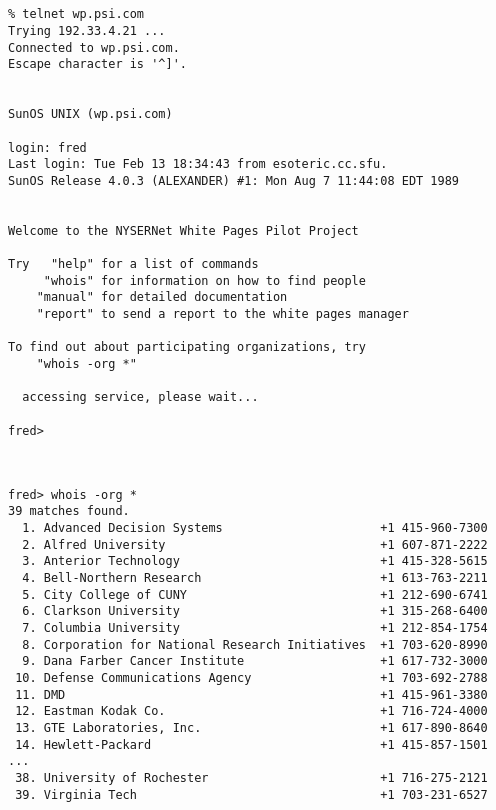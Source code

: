 \begin{bwslide}

\smaller
\begin{verbatim}


% telnet wp.psi.com
Trying 192.33.4.21 ...
Connected to wp.psi.com.
Escape character is '^]'.


SunOS UNIX (wp.psi.com)

login: fred
Last login: Tue Feb 13 18:34:43 from esoteric.cc.sfu.
SunOS Release 4.0.3 (ALEXANDER) #1: Mon Aug 7 11:44:08 EDT 1989


Welcome to the NYSERNet White Pages Pilot Project

Try   "help" for a list of commands
     "whois" for information on how to find people
    "manual" for detailed documentation
    "report" to send a report to the white pages manager

To find out about participating organizations, try
    "whois -org *"

  accessing service, please wait...

fred>
\end{verbatim}
\end{bwslide}


\begin{bwslide}

\smaller
\begin{verbatim}


fred> whois -org *
39 matches found.
  1. Advanced Decision Systems                      +1 415-960-7300
  2. Alfred University                              +1 607-871-2222
  3. Anterior Technology                            +1 415-328-5615
  4. Bell-Northern Research                         +1 613-763-2211
  5. City College of CUNY                           +1 212-690-6741
  6. Clarkson University                            +1 315-268-6400
  7. Columbia University                            +1 212-854-1754
  8. Corporation for National Research Initiatives  +1 703-620-8990
  9. Dana Farber Cancer Institute                   +1 617-732-3000
 10. Defense Communications Agency                  +1 703-692-2788
 11. DMD                                            +1 415-961-3380
 12. Eastman Kodak Co.                              +1 716-724-4000
 13. GTE Laboratories, Inc.                         +1 617-890-8640
 14. Hewlett-Packard                                +1 415-857-1501
...
 38. University of Rochester                        +1 716-275-2121
 39. Virginia Tech                                  +1 703-231-6527
\end{verbatim}
\end{bwslide}


